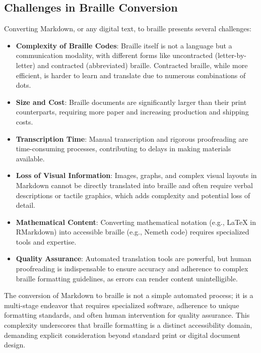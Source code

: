 \subsection{Challenges in Braille Conversion}
Converting Markdown, or any digital text, to braille presents several challenges:
\begin{itemize}
    \item \textbf{Complexity of Braille Codes}: Braille itself is not a language but a communication modality, with different forms like uncontracted (letter-by-letter) and contracted (abbreviated) braille.\cite{InclusiveASL}\cite{TextToBraille} Contracted braille, while more efficient, is harder to learn and translate due to numerous combinations of dots.\cite{TextToBraille}
    \item \textbf{Size and Cost}: Braille documents are significantly larger than their print counterparts, requiring more paper and increasing production and shipping costs.\cite{TextToBraille}
    \item \textbf{Transcription Time}: Manual transcription and rigorous proofreading are time-consuming processes, contributing to delays in making materials available.\cite{BrailleProcess}\cite{TextToBraille}
    \item \textbf{Loss of Visual Information}: Images, graphs, and complex visual layouts in Markdown cannot be directly translated into braille and often require verbal descriptions or tactile graphics, which adds complexity and potential loss of detail.\cite{InclusiveASL}\cite{TextToBraille}\cite{BRLFormat}
    \item \textbf{Mathematical Content}: Converting mathematical notation (e.g., LaTeX in RMarkdown) into accessible braille (e.g., Nemeth code) requires specialized tools and expertise.\cite{BrailleBlaster}
    \item \textbf{Quality Assurance}: Automated translation tools are powerful, but human proofreading is indispensable to ensure accuracy and adherence to complex braille formatting guidelines, as errors can render content unintelligible.\cite{BrailleProcess}
\end{itemize}
The conversion of Markdown to braille is not a simple automated process; it is a multi-stage endeavor that requires specialized software, adherence to unique formatting standards, and often human intervention for quality assurance. This complexity underscores that braille formatting is a distinct accessibility domain, demanding explicit consideration beyond standard print or digital document design.

